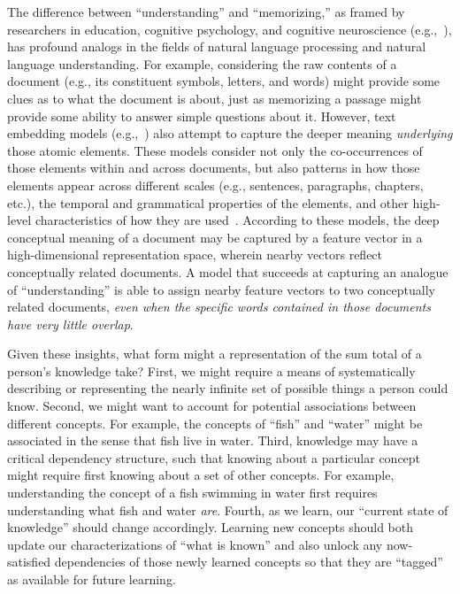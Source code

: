\documentclass[10pt]{article}
\begin{document}
The difference between ``understanding'' and ``memorizing,'' as framed by
researchers in education, cognitive psychology, and cognitive
neuroscience (e.g.,~\citealp{Kato40, Gall00, ScotEtal07, HallGree08, Macl05}),
has profound analogs in the fields of natural language processing and natural
language understanding. For example, considering the raw contents of a document
(e.g., its constituent symbols, letters, and words) might provide some
clues as to what the document is about, just as memorizing a passage
might provide some ability to answer simple questions about it. However, text
embedding models (e.g.,~\citealp{LandDuma97, DeerEtal90, BleiEtal03,
BleiLaff06, MikoEtal13a, CerEtal18, BrowEtal20}) also attempt to capture the
deeper meaning \textit{underlying} those atomic elements. These models consider
not only the co-occurrences of those elements within and across documents, but
also patterns in how those elements appear across different scales (e.g.,
sentences, paragraphs, chapters, etc.), the temporal and grammatical properties
of the elements, and other high-level characteristics of how they are
used~\citep{Mann20, Mann21a}. According to these models, the deep conceptual
meaning of a document may be captured by a feature vector in a high-dimensional
representation space, wherein nearby vectors reflect conceptually related
documents. A model that succeeds at capturing an analogue of ``understanding'' is
able to assign nearby feature vectors to two conceptually related documents,
\textit{even when the specific words contained in those documents have very little
overlap}.

Given these insights, what form might a representation of the sum total of a
person's knowledge take? First, we might require a means of systematically
describing or representing the nearly infinite set of possible things a person
could know. Second, we might want to account for potential associations between
different concepts. For example, the concepts of ``fish'' and ``water'' might
be associated in the sense that fish live in water. Third, knowledge may have a
critical dependency structure, such that knowing about a particular concept
might require first knowing about a set of other concepts. For example,
understanding the concept of a fish swimming in water first requires
understanding what fish and water \textit{are}. Fourth, as we learn, our
``current state of knowledge'' should change accordingly. Learning new concepts
should both update our characterizations of ``what is known'' and also
unlock any now-satisfied dependencies of those newly learned concepts so that
they are ``tagged'' as available for future learning.
\end{document}
